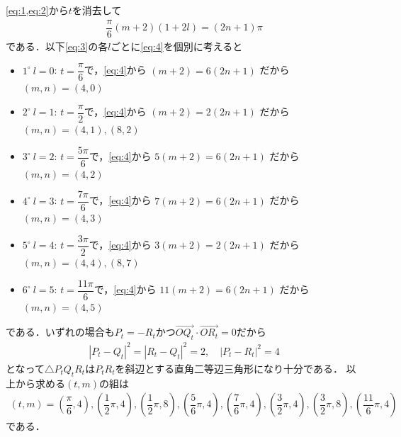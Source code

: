 \documentclass[../../main.tex]{subfiles}
\begin{document}
\cref{eq:1,eq:2}から$t$を消去して
\begin{align}
  \dfrac{\pi}{6}(m+2)(1+2l) = (2n+1)\pi \label{eq:4}
\end{align}
である．以下\cref{eq:3}の各$l$ごとに\cref{eq:4}を個別に考えると
\begin{itemize}
  \item $1^\circ \ l=0$: $t=\dfrac{\pi}{6}$で，\cref{eq:4}から $(m+2) = 6(2n+1)$ だから $(m, n) = (4, 0)$
  \item $2^\circ \ l=1$: $t=\dfrac{\pi}{2}$で，\cref{eq:4}から $(m+2) = 2(2n+1)$ だから $(m, n) = (4, 1), (8, 2)$
  \item $3^\circ \ l=2$: $t=\dfrac{5\pi}{6}$で，\cref{eq:4}から $5(m+2) = 6(2n+1)$ だから $(m, n) = (4, 2)$
  \item $4^\circ \ l=3$: $t=\dfrac{7\pi}{6}$で，\cref{eq:4}から $7(m+2) = 6(2n+1)$ だから $(m, n) = (4, 3)$
  \item $5^\circ \ l=4$: $t=\dfrac{3\pi}{2}$で，\cref{eq:4}から $3(m+2) = 2(2n+1)$ だから $(m, n) = (4, 4), (8, 7)$
  \item $6^\circ \ l=5$: $t=\dfrac{11\pi}{6}$で，\cref{eq:4}から $11(m+2) = 6(2n+1)$ だから $(m, n) = (4, 5)$
\end{itemize}
である．いずれの場合も$P_t=-R_t$かつ$\overrightarrow{OQ_t}\cdot\overrightarrow{OR_t}=0$だから
\begin{align}
  |P_t-Q_t|^2=|R_t-Q_t|^2=2, \quad |P_t-R_t|^2=4
\end{align}
となって$\triangle P_tQ_tR_t$は$P_tR_t$を斜辺とする直角二等辺三角形になり十分である．
以上から求める$(t,m)$の組は
\begin{align}
  (t, m) = \left(\dfrac{\pi}{6}, 4\right), \left(\dfrac{1}{2}\pi, 4\right), \left(\dfrac{1}{2}\pi, 8\right), \left(\dfrac{5}{6}\pi, 4\right), \left(\dfrac{7}{6}\pi, 4\right), \left(\dfrac{3}{2}\pi, 4\right), \left(\dfrac{3}{2}\pi, 8\right), \left(\dfrac{11}{6}\pi, 4\right)
\end{align}
である．
\end{document}
